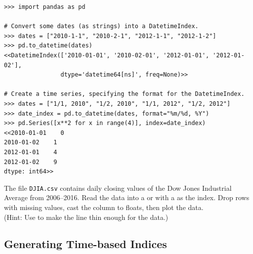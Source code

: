 \begin{lstlisting}
>>> import pandas as pd

# Convert some dates (as strings) into a DatetimeIndex.
>>> dates = ["2010-1-1", "2010-2-1", "2012-1-1", "2012-1-2"]
>>> pd.to_datetime(dates)
<<DatetimeIndex(['2010-01-01', '2010-02-01', '2012-01-01', '2012-01-02'],
                dtype='datetime64[ns]', freq=None)>>

# Create a time series, specifying the format for the DatetimeIndex.
>>> dates = ["1/1, 2010", "1/2, 2010", "1/1, 2012", "1/2, 2012"]
>>> date_index = pd.to_datetime(dates, format="%m/%d, %Y")
>>> pd.Series([x**2 for x in range(4)], index=date_index)
<<2010-01-01    0
2010-01-02    1
2012-01-01    4
2012-01-02    9
dtype: int64>>
\end{lstlisting}

\begin{problem} %
The file \texttt{DJIA.csv} contains daily closing values of the Dow Jones Industrial Average from 2006--2016.
Read the data into a  or  with a  as the index.
Drop rows with missing values, cast the  column to floats, then plot the data.
\\(Hint: Use  to make the line thin enough for the data.)
\label{prob:timeseries-dowjones}
\end{problem}

\subsection*{Generating Time-based Indices} %

